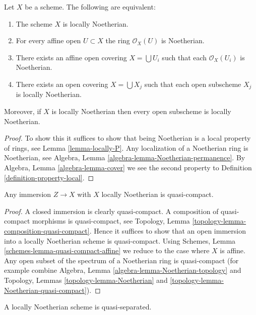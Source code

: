 \begin{lemma}
\label{lemma-locally-Noetherian}
Let $X$ be a scheme. The following are equivalent:
\begin{enumerate}
\item The scheme $X$ is locally Noetherian.
\item For every affine open $U \subset X$ the ring $\mathcal{O}_X(U)$
is Noetherian.
\item There exists an affine open covering $X = \bigcup U_i$ such that
each $\mathcal{O}_X(U_i)$ is Noetherian.
\item There exists an open covering $X = \bigcup X_j$
such that each open subscheme $X_j$ is locally Noetherian.
\end{enumerate}
Moreover, if $X$ is locally Noetherian then every open subscheme
is locally Noetherian.
\end{lemma}

\begin{proof}
To show this it suffices to show that being Noetherian is a local
property of rings, see Lemma \ref{lemma-locally-P}.
Any localization of a Noetherian ring is Noetherian, see
Algebra, Lemma \ref{algebra-lemma-Noetherian-permanence}.
By Algebra, Lemma \ref{algebra-lemma-cover} we see the second
property to Definition \ref{definition-property-local}.
\end{proof}

\begin{lemma}
\label{lemma-immersion-into-noetherian}
Any immersion $Z \to X$ with $X$ locally Noetherian is quasi-compact.
\end{lemma}

\begin{proof}
A closed immersion is clearly quasi-compact.
A composition of quasi-compact morphisms is quasi-compact,
see Topology, Lemma \ref{topology-lemma-composition-quasi-compact}.
Hence it suffices to show that an open immersion into
a locally Noetherian scheme is quasi-compact.
Using Schemes, Lemma \ref{schemes-lemma-quasi-compact-affine}
we reduce to the case where $X$ is affine.
Any open subset of the spectrum of a Noetherian ring
is quasi-compact (for example
combine Algebra, Lemma \ref{algebra-lemma-Noetherian-topology} and
Topology, Lemmas \ref{topology-lemma-Noetherian} and
\ref{topology-lemma-Noetherian-quasi-compact}).
\end{proof}

\begin{lemma}
\label{lemma-locally-Noetherian-quasi-separated}
A locally Noetherian scheme is quasi-separated.
\end{lemma}

